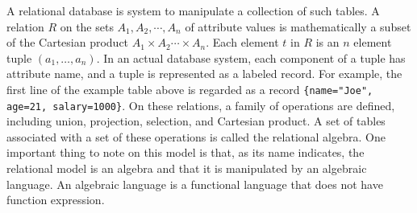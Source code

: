 \documentclass{jbook}
\begin{document}
	A relational database is system to manipulate a collection of
such tables.
	A relation $R$ on the sets $A_1,A_2,\cdots,A_n$ of attribute
values is mathematically a subset of the Cartesian product
$A_1\times A_2 \cdots \times A_n$.
	Each element $t$ in $R$  is an $n$ element tuple $(a_1,\ldots,a_n)$.
	In an actual database system, each component of a tuple has
attribute name, and a tuple is represented as a labeled record.
	For example, the first line of the example table above is
regarded as a record  {\tt \{name="Joe", age=21, salary=1000\}}.
	On these relations, a family of operations are defined,
including union, projection, selection, and Cartesian product.
	A set of tables associated with a set of these operations is
called the relational algebra.
	One important thing to note on this model is that, as its name
indicates, the relational model is an algebra and that it is
manipulated by an algebraic language.
	An algebraic language is a functional language that does not
have function expression.
\end{document}

